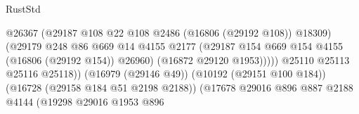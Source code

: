 \begin{lexlean}{RustStd}
\begin{coremodule}
                                                          @26367
                                                          (@29187
                                                            @108
                                                            @22
                                                            @108
                                                            @2486
                                                            (@16806 (@29192 @108))
                                                            @18309)
                                                          (@29179
                                                            @248
                                                            @86
                                                            @669
                                                            @14
                                                            @4155
                                                            @2177
                                                            (@29187
                                                              @154
                                                              @669
                                                              @154
                                                              @4155
                                                              (@16806 (@29192 @154))
                                                              @26960)
                                                            (@16872 @29120 @1953)))))
                                                    @25110
                                                    @25113
                                                    @25116
                                                    @25118))
                                                (@16979 (@29146 @49))
                                                (@10192 (@29151 @100 @184))
                                                (@16728 (@29158 @184 @51 @2198 @2188))
                                                (@17678
                                                  @29016
                                                  @896
                                                  @887
                                                  @2188
                                                  @4144
                                                  (@19298
                                                    @29016
                                                    @1953
                                                    @896

\end{coremodule}
\end{lexlean}
